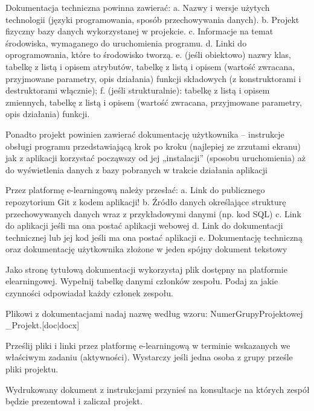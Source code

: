 \begin{DoxyEnumerate}
\item Dokumentacja techniczna powinna zawierać\+: a. Nazwy i wersje użytych technologii (języki programowania, sposób przechowywania danych). b. Projekt fizyczny bazy danych wykorzystanej w projekcie. c. Informacje na temat środowiska, wymaganego do uruchomienia programu. d. Linki do oprogramowania, które to środowisko tworzą. e. (jeśli obiektowo) nazwy klas, tabelkę z listą i opisem atrybutów, tabelkę z listą i opisem (wartość zwracana, przyjmowane parametry, opis działania) funkcji składowych (z konstruktorami i destruktorami włącznie); f. (jeśli strukturalnie)\+: tabelkę z listą i opisem zmiennych, tabelkę z listą i opisem (wartość zwracana, przyjmowane parametry, opis działania) funkcji.
\item Ponadto projekt powinien zawierać dokumentację użytkownika – instrukcje obsługi programu przedstawiającą krok po kroku (najlepiej ze zrzutami ekranu) jak z aplikacji korzystać począwszy od jej „instalacji” (sposobu uruchomienia) aż do wyświetlenia danych z bazy pobranych w trakcie działania aplikacji
\end{DoxyEnumerate}
\begin{DoxyEnumerate}
\item Przez platformę e-\/learningową należy przesłać\+: a. Link do publicznego repozytorium Git z kodem aplikacji! b. Źródło danych określające strukturę przechowywanych danych wraz z przykładowymi danymi (np. kod S\+QL) c. Link do aplikacji jeśli ma ona postać aplikacji webowej d. Link do dokumentacji technicznej lub jej kod jeśli ma ona postać aplikacji e. Dokumentację techniczną oraz dokumentację użytkownika złożone w jeden spójny dokument tekstowy
\item Jako stronę tytułową dokumentacji wykorzystaj plik dostępny na platformie elearningowej. Wypełnij tabelkę danymi członków zespołu. Podaj za jakie czynności odpowiadał każdy członek zespołu.
\item Plikowi z dokumentacjami nadaj nazwę według wzoru\+: Numer\+Grupy\+Projektowej \+\_\+\+Projekt.\mbox{[}doc$\vert$docx\mbox{]}
\item Prześlij pliki i linki przez platformę e-\/learningową w terminie wskazanych we właściwym zadaniu (aktywności). Wystarczy jeśli jedna osoba z grupy prześle pliki projektu.
\item Wydrukowany dokument z instrukcjami przynieś na konsultacje na których zespół będzie prezentował i zaliczał projekt. 
\end{DoxyEnumerate}